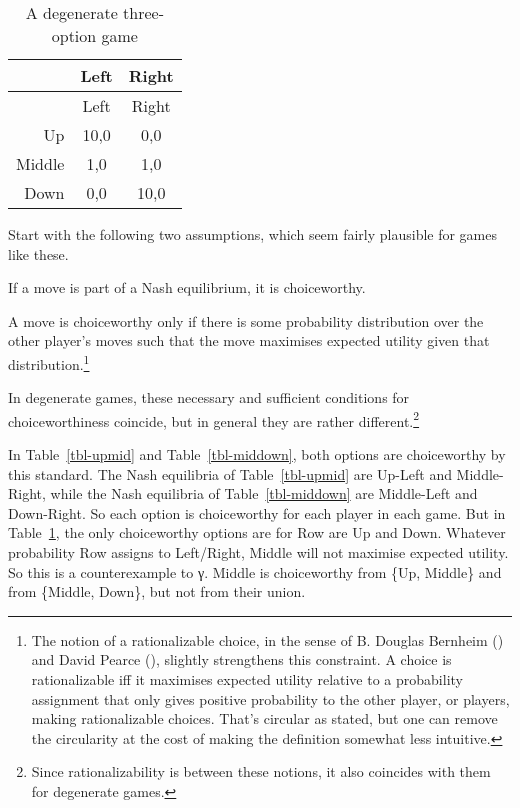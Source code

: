 \documentclass[
  10.5pt,
  twoside]{article}
\providecommand{\tightlist}{%
  \setlength{\itemsep}{0pt}\setlength{\parskip}{0pt}}
\let\olditemize\itemize
\let\endolditemize\enditemize
\renewenvironment{itemize}
  {\vskip 5pt\olditemize}
  {\endolditemize\vskip 5pt}
\begin{document}
\begin{longtable}[]{@{}rcc@{}}
\caption{A degenerate three-option
game}\label{tbl-allthree}\tabularnewline
\toprule\noalign{}
& Left & Right \\
\midrule\noalign{}
\endfirsthead
\toprule\noalign{}
& Left & Right \\
\midrule\noalign{}
\endhead
\bottomrule\noalign{}
\endlastfoot
Up & 10,0 & 0,0 \\
Middle & 1,0 & 1,0 \\
Down & 0,0 & 10,0 \\
\end{longtable}

Start with the following two assumptions, which seem fairly plausible
for games like these.

\begin{itemize}
\tightlist
\item
  If a move is part of a Nash equilibrium, it is choiceworthy.
\item
  A move is choiceworthy only if there is some probability distribution
  over the other player's moves such that the move maximises expected
  utility given that distribution.\footnote{The notion of a
    rationalizable choice, in the sense of B. Douglas Bernheim
    () and David Pearce
    (), slightly strengthens this
    constraint. A choice is rationalizable iff it maximises expected
    utility relative to a probability assignment that only gives
    positive probability to the other player, or players, making
    rationalizable choices. That's circular as stated, but one can
    remove the circularity at the cost of making the definition somewhat
    less intuitive.}
\end{itemize}

In degenerate games, these necessary and sufficient conditions for
choiceworthiness coincide, but in general they are rather
different.\footnote{Since rationalizability is between these notions, it
  also coincides with them for degenerate games.}

In Table~\ref{tbl-upmid} and Table~\ref{tbl-middown}, both options are
choiceworthy by this standard. The Nash equilibria of
Table~\ref{tbl-upmid} are Up-Left and Middle-Right, while the Nash
equilibria of Table~\ref{tbl-middown} are Middle-Left and Down-Right. So
each option is choiceworthy for each player in each game. But in
Table~\ref{tbl-allthree}, the only choiceworthy options are for Row are
Up and Down. Whatever probability Row assigns to Left/Right, Middle will
not maximise expected utility. So this is a counterexample to γ. Middle
is choiceworthy from \{Up, Middle\} and from \{Middle, Down\}, but not
from their union.
\end{document}
